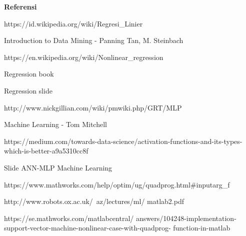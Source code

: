 \documentclass[12pt]{article}%
\begin{document}
\par \textbf{Referensi}
\par [1] https://id.wikipedia.org/wiki/Regresi\_Linier
\par [2] Introduction to Data Mining - Panning Tan, M. Steinbach
\par [3] https://en.wikipedia.org/wiki/Nonlinear\_regression
\par [4] Regression book
\par [5] Regression slide
\par [6] http://www.nickgillian.com/wiki/pmwiki.php/GRT/MLP
\par [7] Machine Learning - Tom Mitchell
\par [8] https://medium.com/towards-data-science/activation-functions-and-its-types-which-is-better-a9a5310cc8f
\par [9] Slide ANN-MLP Machine Learning
\par [10] https://www.mathworks.com/help/optim/ug/quadprog.html#inputarg\_f
\par [11] http://www.robots.ox.ac.uk/~az/lectures/ml/ matlab2.pdf
\par [12] https://se.mathworks.com/matlabcentral/ answers/104248-implementation-support-vector-machine-nonlinear-case-with-quadprog- function-in-matlab
\end{document}
